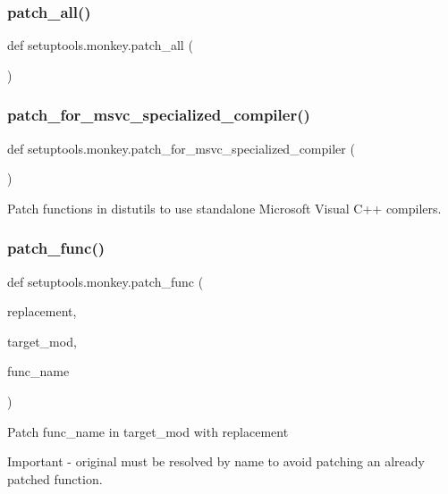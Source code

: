 \mbox{\label{namespacesetuptools_1_1monkey_a593eccd6bead483dc9479ed13d1c4f16}} 
\subsubsection{\texorpdfstring{patch\+\_\+all()}{patch\_all()}}
{\footnotesize\ttfamily def setuptools.\+monkey.\+patch\+\_\+all (\begin{DoxyParamCaption}{ }\end{DoxyParamCaption})}

\mbox{\label{namespacesetuptools_1_1monkey_a496bc1769e481213444b1d53185b1b89}} 
\subsubsection{\texorpdfstring{patch\+\_\+for\+\_\+msvc\+\_\+specialized\+\_\+compiler()}{patch\_for\_msvc\_specialized\_compiler()}}
{\footnotesize\ttfamily def setuptools.\+monkey.\+patch\+\_\+for\+\_\+msvc\+\_\+specialized\+\_\+compiler (\begin{DoxyParamCaption}{ }\end{DoxyParamCaption})}

\begin{DoxyVerb}Patch functions in distutils to use standalone Microsoft Visual C++
compilers.
\end{DoxyVerb}
 \mbox{\label{namespacesetuptools_1_1monkey_ac6c1bb45a1d90ebcaf099ada0682616b}} 
\subsubsection{\texorpdfstring{patch\+\_\+func()}{patch\_func()}}
{\footnotesize\ttfamily def setuptools.\+monkey.\+patch\+\_\+func (\begin{DoxyParamCaption}\item[{}]{replacement,  }\item[{}]{target\+\_\+mod,  }\item[{}]{func\+\_\+name }\end{DoxyParamCaption})}

\begin{DoxyVerb}Patch func_name in target_mod with replacement

Important - original must be resolved by name to avoid
patching an already patched function.
\end{DoxyVerb}
 